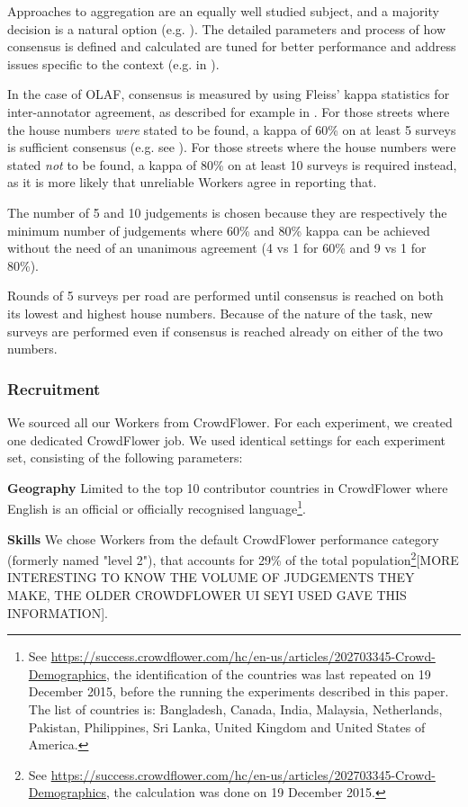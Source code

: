 Approaches to aggregation are an equally well studied subject, and a majority decision is a natural option (e.g. \cite{Le:2010ug}). The detailed parameters and process of how consensus is defined and calculated are tuned for better performance and address issues specific to the context (e.g. in \cite{Hirth:2011fh}). 

In the case of OLAF, consensus is measured by using Fleiss' kappa statistics for inter-annotator agreement, as described for example in \cite{Nowak:2010gt}. For those streets where the house numbers {\it were} stated to be found, a kappa of 60\% on at least 5 surveys is sufficient consensus (e.g. see \cite{Landis:1977kv}). For those streets where the house numbers were stated {\it not} to be found, a kappa of 80\% on at least 10 surveys is required instead, as it is more likely that unreliable Workers agree in reporting that.

The number of 5 and 10 judgements is chosen because they are respectively the minimum number of judgements where 60\% and 80\% kappa can be achieved without the need of an unanimous agreement (4 vs 1 for 60\% and 9 vs 1 for 80\%). 

Rounds of 5 surveys per road are performed until consensus is reached on both its lowest and highest house numbers. Because of the nature of the task, new surveys are performed even if consensus is reached already on either of the two numbers.  

\subsubsection{Recruitment}

We sourced all our Workers from CrowdFlower. For each experiment, we created one dedicated CrowdFlower job. We used identical settings for each experiment set, consisting of the following parameters:

\textbf{Geography} Limited to the top 10 contributor countries in CrowdFlower where English is an official or officially recognised language\footnote{See \url{https://success.crowdflower.com/hc/en-us/articles/202703345-Crowd-Demographics}, the identification of the countries was last repeated on 19 December 2015, before the running the experiments described in this paper. The list of countries is: Bangladesh, Canada, India, Malaysia, Netherlands, Pakistan, Philippines, Sri Lanka, United Kingdom and United States of America.}.

\textbf{Skills} We chose Workers from the default CrowdFlower performance category (formerly named "level 2"), that accounts for 29\% of the total population\footnote{See \url{https://success.crowdflower.com/hc/en-us/articles/202703345-Crowd-Demographics}, the calculation was done on 19 December 2015.}[MORE INTERESTING TO KNOW THE VOLUME OF JUDGEMENTS THEY MAKE, THE OLDER CROWDFLOWER UI SEYI USED GAVE THIS INFORMATION].

